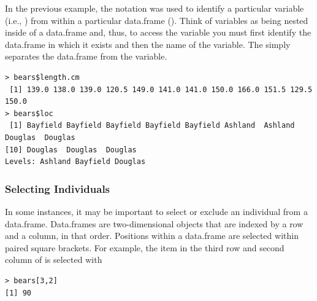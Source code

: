 \documentclass[10pt,openany]{book}\usepackage[]{graphicx}\usepackage[]{color}
\makeatletter
\newenvironment{kframe}{%
 \def\at@end@of@kframe{}%
 \ifinner\ifhmode%
  \def\at@end@of@kframe{\end{minipage}}%
  \begin{minipage}{\columnwidth}%
 \fi\fi%
 \def\FrameCommand##1{\hskip\@totalleftmargin \hskip-\fboxsep
 \colorbox{shadecolor}{##1}\hskip-\fboxsep
     \hskip-\linewidth \hskip-\@totalleftmargin \hskip\columnwidth}%
 \MakeFramed {\advance\hsize-\width
   \@totalleftmargin\z@ \linewidth\hsize
   \@setminipage}}%
 {\par\unskip\endMakeFramed%
 \at@end@of@kframe}
\newenvironment{knitrout}{}{} %
\makeatother
\begin{document}
In the previous example, the \R{\$} notation was used to identify a particular variable (i.e., ) from within a particular data.frame ().  Think of variables as being nested inside of a data.frame and, thus, to access the variable you must first identify the data.frame in which it exists and then the name of the variable.  The \R{\$} simply separates the data.frame from the variable.
\begin{knitrout}
\color{fgcolor}\begin{kframe}
\begin{verbatim}
> bears$length.cm
 [1] 139.0 138.0 139.0 120.5 149.0 141.0 141.0 150.0 166.0 151.5 129.5 150.0
> bears$loc
 [1] Bayfield Bayfield Bayfield Bayfield Bayfield Ashland  Ashland  Douglas  Douglas 
[10] Douglas  Douglas  Douglas 
Levels: Ashland Bayfield Douglas
\end{verbatim}
\end{kframe}
\end{knitrout}


\subsubsection{Selecting Individuals}  \label{sect:RSelectIndivs}
\vspace{-12pt}

In some instances, it may be important to select or exclude an individual from a data.frame.  Data.frames are two-dimensional objects that are indexed by a row and a column, in that order.  Positions within a data.frame are selected within paired square brackets.  For example, the item in the third row and second column of  is selected with
\begin{knitrout}
\color{fgcolor}\begin{kframe}
\begin{verbatim}
> bears[3,2]
[1] 90
\end{verbatim}
\end{kframe}
\end{knitrout}

\end{document}
